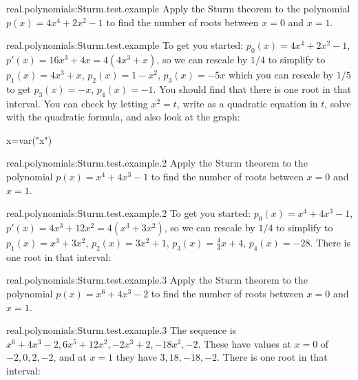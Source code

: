 \begin{problem}{real.polynomials:Sturm.test.example}
Apply the Sturm theorem to the polynomial \(p(x)=4x^4+2x^2-1\) to find the number of roots between \(x=0\) and \(x=1\).
\end{problem}
\begin{answer}{real.polynomials:Sturm.test.example}
To get you started: \(p_0(x)=4x^4+2x^2-1\), \(p'(x)=16x^3+4x=4(4x^3+x)\), so we can rescale by \(1/4\) to simplify to \(p_1(x)=4x^3+x\), \(p_2(x)=1-x^2\), \(p_3(x)=-5x\) which you can rescale by \(1/5\) to get \(p_3(x)=-x\), \(p_4(x)=-1\).
You should find that there is one root in that interval. You can check by letting \(x^2=t\), write as a quadratic equation in \(t\), solve with the quadratic formula, and also look at the graph:
\begin{center}
\begin{sagesilent}
x=var("x")
\end{sagesilent}
\end{center}
\end{answer}
\begin{problem}{real.polynomials:Sturm.test.example.2}
Apply the Sturm theorem to the polynomial \(p(x)=x^4+4x^3-1\) to find the number of roots between \(x=0\) and \(x=1\).
\end{problem}
\begin{answer}{real.polynomials:Sturm.test.example.2}
To get you started: \(p_0(x)=x^4+4x^3-1\), \(p'(x)=4x^3 + 12x^2=4(x^3+3x^2)\), so we can rescale by \(1/4\) to simplify to \(p_1(x)=x^3+3x^2\), \(p_2(x)=3x^2 + 1\), \(p_3(x)=\frac{4}{3}x + 4\), \(p_4(x)= -28\).
There is one root in that interval:
\begin{center}
\end{center}
\end{answer}
\begin{problem}{real.polynomials:Sturm.test.example.3}
Apply the Sturm theorem to the polynomial \(p(x)=x^6+4x^3-2\) to find the number of roots between \(x=0\) and \(x=1\).
\end{problem}
\begin{answer}{real.polynomials:Sturm.test.example.3}
The sequence is \(x^6+4x^3-2, 6x^5+12x^2, -2x^3+2, -18x^2, -2\). 
These have values at \(x=0\) of \(-2, 0, 2, -2\), and at \(x=1\) they have \(3, 18, -18, -2\).
There is one root in that interval:
\begin{center}
\end{center}
\end{answer}

